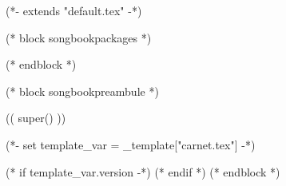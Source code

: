 (*- extends "default.tex" -*)

(* block songbookpackages *)
\usepackage[
    (* for option in _bookoptions *)((option)),
    (* endfor *)
    ]{crepbook}
(* endblock *)

(* block songbookpreambule *)
\usepackage[
     a5paper %
     ,includeheadfoot %
     ,hmarginratio=1:1 %
     ,outer=1.4cm %
     ,vmarginratio=1:1 %
     ,bmargin=1.0cm %
     ]{geometry}

(( super() ))


\usepackage{fontspec}

\setmainfont{Noto Serif}
\setmonofont{Liberation Mono}
\def\@chordfont{Liberation Mono}

\pagestyle{empty}

(*- set template_var = _template["carnet.tex"] -*)


\renewcommand{\snumbgcolor}{SongNumberBgColor}
\renewcommand{\notebgcolor}{NoteBgColor}
\renewcommand{\idxbgcolor}{IndexBgColor}

\usepackage[
    bookmarks,
    bookmarksopen,
    hyperfigures=true,
    colorlinks=true,
    linkcolor=tango-green-3,
    urlcolor=tango-blue-3,
    unicode=true,
    ]{hyperref}
\usepackage{datetime}
\usepackage{emoji}

\date{}
  
\subtitle{
  Mariage de Yannick et Johan 
}


(* if template_var.version -*)
(* endif *)
(* endblock *)